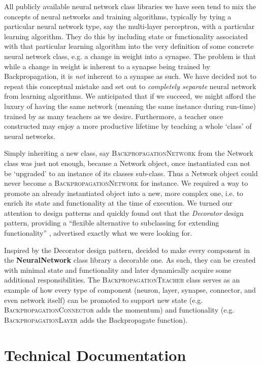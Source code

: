 All publicly available neural network class libraries we have seen tend to mix the concepts of neural networks and training algorithms, typically by tying a particular neural network type, say the multi-layer perceptron, with a particular learning algorithm. They do this by including state or functionality associated with that particular learning algorithm into the very definition of some concrete neural network class, e.g. a change in weight into a synapse. The problem is that while a change in weight is inherent to a synapse being trained by Backpropagation, it is \textit{not} inherent to a synapse as such. We have decided not to repeat this conceptual mistake and set out to \textit{completely separate} neural network from learning algorithms.  We anticipated that if we succeed, we might afford the luxury of having the same network (meaning the same instance during run-time) trained by as many teachers as we desire. Furthermore, a teacher once constructed may enjoy a more productive lifetime by teaching a whole `class' of neural networks.

Simply inheriting a new class, say \textsc{BackpropagationNetwork} from the Network class was just not enough, because a Network object, once instantiated can not be `upgraded' to an instance of its classes sub-class. Thus a Network object could never become a \textsc{BackpropagationNetwork} for instance. We required a way to promote an already instantiated object into a new, more complex one, i.e. to enrich its state and functionality at the time of execution. We turned our attention to design patterns and quickly found out that the \textit{Decorator} design pattern, providing a ``flexible alternative to subclassing for extending functionality'' \cite{dofactory-Decorator}, advertised exactly what we were looking for.

Inspired by the Decorator design pattern, decided to make every component in the \textbf{NeuralNetwork} class library a decorable one. As such, they can be created with minimal state and functionality and later dynamically acquire some additional responsibilities. The \textsc{BackpropagationTeacher} class serves as an example of how every type of component (neuron, layer, synapse, connector, and even network itself) can be promoted to support new state (e.g. \textsc{BackpropagationConnector} adds the momentum) and functionality (e.g. \textsc{BackpropagationLayer} adds the Backpropagate function).

\section{Technical Documentation}


